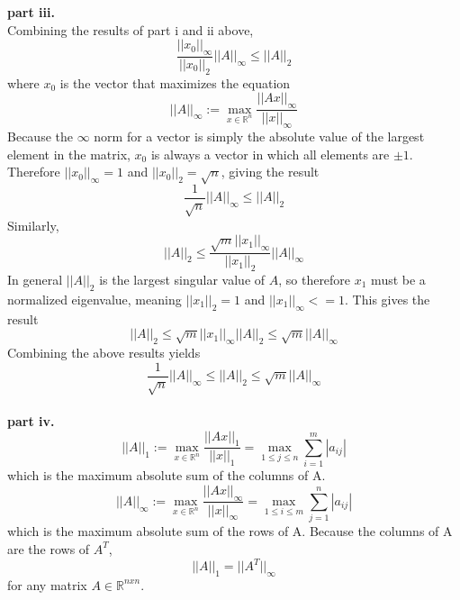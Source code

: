\documentclass{article} %
\begin{document}
\textbf{part iii.} \\
Combining the results of part i and ii above, 
\begin{equation}
\frac{||x_0||_{\infty}}{||x_0||_2}||A||_{\infty} \leq ||A||_2
\end{equation}
where $x_0$ is the vector that maximizes the equation 
\begin{equation}
||A||_{\infty} := \max_{x \in \mathbb{R}^n} \frac{||Ax||_{\infty}}{||x||_{\infty}}
\end{equation}
Because the $\infty$ norm for a vector is simply the absolute value of the largest element in the matrix, $x_0$ is always a vector in which all elements are $\pm 1$.  Therefore $||x_0||_{\infty} = 1$ and $||x_0||_2=\sqrt{n}$, giving the result
\begin{equation}
\frac{1}{\sqrt{n}}||A||_{\infty} \leq ||A||_2
\end{equation}
Similarly,
\begin{equation}
||A||_2   \leq \frac{\sqrt{m} ||x_1||_{\infty}}{||x_1||_2} ||A||_{\infty}
\end{equation}
In general $||A||_2$ is the largest singular value of $A$, so therefore $x_1$ must be a normalized eigenvalue, meaning $||x_1||_2 = 1$ and $||x_1||_{\infty} <= 1$.  This gives the result
\begin{equation}
||A||_2   \leq \sqrt{m} ||x_1||_{\infty} ||A||_2 \leq \sqrt{m}||A||_{\infty}
\end{equation}
Combining the above results yields
\begin{equation}
\frac{1}{\sqrt{n}}||A||_{\infty} \leq ||A||_2 \leq \sqrt{m}||A||_{\infty}
\end{equation}
\\
\textbf{part iv.} \\
\begin{equation}
||A||_1 := \max_{x \in \mathbb{R}^n} \frac{||Ax||_1}{||x||_1} = \max_{1 \leq j \leq n} \sum_{i=1}^m |a_{ij}|
\end{equation}
which is the maximum absolute sum of the columns of A.   
\begin{equation}
||A||_{\infty} := \max_{x \in \mathbb{R}^n} \frac{||Ax||_{\infty}}{||x||_{\infty}} = \max_{1 \leq i \leq m} \sum_{j=1}^n |a_{ij}|
\end{equation}
which is the maximum absolute sum of the rows of A.  Because the columns of A are the rows of $A^T$, 
\begin{equation}
||A||_1 = ||A^T||_{\infty}
\end{equation}
for any matrix $A \in \mathbb{R}^{nxn}$.
\end{document}
